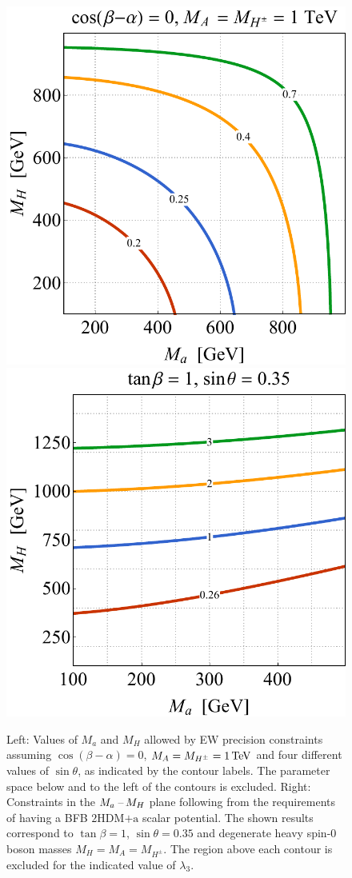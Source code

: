 \documentclass[a4paper, 11pt,notoc]{article}
\newcommand{\hdma}{\ensuremath{\textrm{2HDM+a}}\xspace}
\begin{document}
\begin{figure}[t!]
\centering
\includegraphics[height=.45\textwidth]{figure4l.pdf} \qquad 
\includegraphics[height=.45\textwidth]{figure4r.pdf}
\vspace{4mm}
\caption{\label{fig:EWVAC} Left: Values of $M_a$ and $M_H$ allowed by EW precision constraints assuming $\cos(\beta-\alpha)=0$, $M_A= M_{H^\pm}=1 \, {\rm TeV}$ and four different values of $\sin \theta$, as indicated by the contour labels.  The parameter space below and to the left of the contours is excluded. Right: Constraints in the $M_{a}\hspace{0.5mm}$--$\hspace{0.5mm} M_H$ plane following from the  requirements of having a  BFB \hdma scalar potential. The shown results correspond to $\tan \beta = 1$, $\sin \theta = 0.35$ and degenerate heavy {\color{red} spin-0 boson} masses $M_H = M_A = M_{H^\pm}$. The region above  each contour  is excluded for the indicated value of $\lambda_3$.}  
\end{figure}
\end{document}
